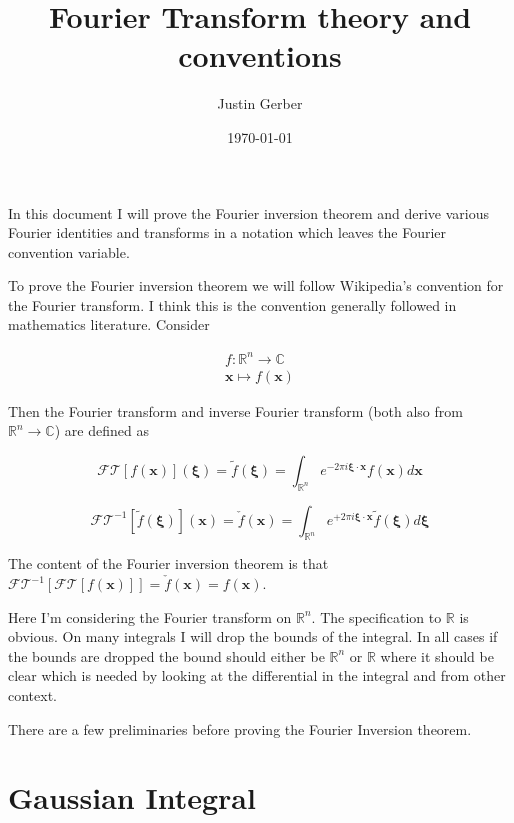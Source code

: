 \documentclass[12pt]{article}
\newcommand{\bv}[1]{\boldsymbol{#1}}
\begin{document}
\title{Fourier Transform theory and conventions}
\author{Justin Gerber}
\date{\today}
\maketitle

In this document I will prove the Fourier inversion theorem and derive various Fourier identities and transforms in a notation which leaves the Fourier convention variable.

To prove the Fourier inversion theorem we will follow Wikipedia's convention for the Fourier transform. I think this is the convention generally followed in mathematics literature. Consider

\begin{align}
f: \mathbb{R}^n \rightarrow \mathbb{C}\\
\bv{x} \mapsto f(\bv{x})
\end{align}

Then the Fourier transform and inverse Fourier transform (both also from $\mathbb{R}^n \rightarrow \mathbb{C}$) are defined as

\begin{equation}
\mathcal{FT}[f(\bv{x})](\bv{\xi})=\tilde{f}(\bv{\xi}) = \int_{\mathbb{R}^n} e^{-2\pi i \bv{\xi}\cdot \bv{x}} f(\bv{x}) d\bv{x}
\end{equation}

\begin{equation}
\mathcal{FT}^{-1}[\tilde{f}(\bv{\xi})](\bv{x}) = \check{f}(\bv{x}) = \int_{\mathbb{R}^n} e^{+2\pi i \bv{\xi}\cdot \bv{x}} \tilde{f}(\bv{\xi}) d\bv{\xi}
\end{equation}

The content of the Fourier inversion theorem is that $\mathcal{FT}^{-1}[\mathcal{FT}[f(\bv{x})]] = \check{f}(\bv{x}) = f(\bv{x})$.

Here I'm considering the Fourier transform on $\mathbb{R}^n$. The specification to $\mathbb{R}$ is obvious. On many integrals I will drop the bounds of the integral. In all cases if the bounds are dropped the bound should either be $\mathbb{R}^n$ or $\mathbb{R}$ where it should be clear which is needed by looking at the differential in the integral and from other context.

There are a few preliminaries before proving the Fourier Inversion theorem.

\section{Gaussian Integral}
\end{document}
